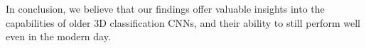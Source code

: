 \documentclass[conference]{IEEEtran}
\begin{document}
In conclusion, we believe that our findings offer valuable insights into the capabilities of older 3D classification CNNs, and their ability to still perform well even in the modern day.




\end{document}
